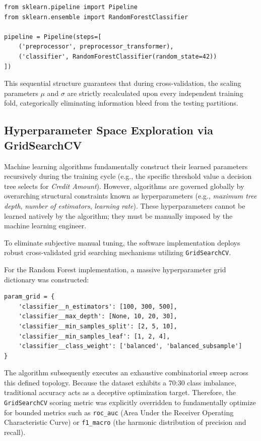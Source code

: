 \begin{verbatim}
from sklearn.pipeline import Pipeline
from sklearn.ensemble import RandomForestClassifier

pipeline = Pipeline(steps=[
    ('preprocessor', preprocessor_transformer),
    ('classifier', RandomForestClassifier(random_state=42))
])
\end{verbatim}

This sequential structure guarantees that during cross-validation, the
scaling parameters \(\mu\) and \(\sigma\) are strictly recalculated upon
every independent training fold, categorically eliminating information
bleed from the testing partitions.

\hypertarget{hyperparameter-space-exploration-via-gridsearchcv}{%
\subsection{Hyperparameter Space Exploration via
GridSearchCV}\label{hyperparameter-space-exploration-via-gridsearchcv}}

Machine learning algorithms fundamentally construct their learned
parameters recursively during the training cycle (e.g., the specific
threshold value a decision tree selects for \emph{Credit Amount}).
However, algorithms are governed globally by overarching structural
constraints known as hyperparameters (e.g., \emph{maximum tree depth},
\emph{number of estimators}, \emph{learning rate}). These
hyperparameters cannot be learned natively by the algorithm; they must
be manually imposed by the machine learning engineer.

To eliminate subjective manual tuning, the software implementation
deploys robust cross-validated grid searching mechanisms utilizing
\texttt{GridSearchCV}.

For the Random Forest implementation, a massive hyperparameter grid
dictionary was constructed:

\begin{verbatim}
param_grid = {
    'classifier__n_estimators': [100, 300, 500],
    'classifier__max_depth': [None, 10, 20, 30],
    'classifier__min_samples_split': [2, 5, 10],
    'classifier__min_samples_leaf': [1, 2, 4],
    'classifier__class_weight': ['balanced', 'balanced_subsample']
}
\end{verbatim}

The algorithm subsequently executes an exhaustive combinatorial sweep
across this defined topology. Because the dataset exhibits a 70:30 class
imbalance, traditional accuracy acts as a deceptive optimization target.
Therefore, the \texttt{GridSearchCV} scoring metric was explicitly
overridden to fundamentally optimize for bounded metrics such as
\texttt{roc\_auc} (Area Under the Receiver Operating Characteristic
Curve) or \texttt{f1\_macro} (the harmonic distribution of precision and
recall).

